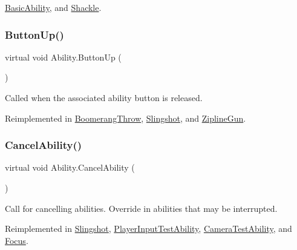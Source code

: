 \hyperlink{class_basic_ability_aec13c3d43d6690106f150026c59b63f0}{Basic\+Ability}, and \hyperlink{class_shackle_a19ae419f51b201f85310105c4fb2ca87}{Shackle}.

\hypertarget{class_ability_ad13b45ac8d2205494b2c12d16677fe26}{}\label{class_ability_ad13b45ac8d2205494b2c12d16677fe26} 
\subsubsection{\texorpdfstring{Button\+Up()}{ButtonUp()}}
{\footnotesize\ttfamily virtual void Ability.\+Button\+Up (\begin{DoxyParamCaption}{ }\end{DoxyParamCaption})\hspace{0.3cm}{\ttfamily [virtual]}}



Called when the associated ability button is released. 



Reimplemented in \hyperlink{class_boomerang_throw_a058894b26dc8d46886d79faefa4e36aa}{Boomerang\+Throw}, \hyperlink{class_slingshot_a6d052ffbe09939626984fb9af095be54}{Slingshot}, and \hyperlink{class_zipline_gun_a9ce4103f03cae60f268a652c67ae0b7d}{Zipline\+Gun}.

\hypertarget{class_ability_ab0eaf1ad670e0624a5534c50b10c002f}{}\label{class_ability_ab0eaf1ad670e0624a5534c50b10c002f} 
\subsubsection{\texorpdfstring{Cancel\+Ability()}{CancelAbility()}}
{\footnotesize\ttfamily virtual void Ability.\+Cancel\+Ability (\begin{DoxyParamCaption}{ }\end{DoxyParamCaption})\hspace{0.3cm}{\ttfamily [virtual]}}



Call for cancelling abilities. Override in abilities that may be interrupted. 



Reimplemented in \hyperlink{class_slingshot_a53b90ca543630d2a799da52e0ba7684c}{Slingshot}, \hyperlink{class_player_input_test_ability_adc59dfeabbb2e1cdff7b81797c9f3946}{Player\+Input\+Test\+Ability}, \hyperlink{class_camera_test_ability_ac3a251d3757f6d45f96668631b26ff7d}{Camera\+Test\+Ability}, and \hyperlink{class_focus_ae3bec489a21cdf93bd302eaf01c86b4b}{Focus}.

